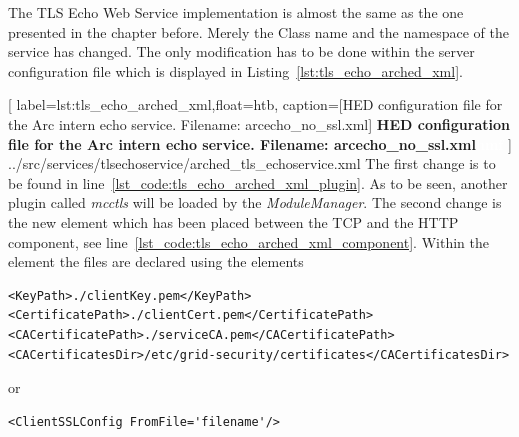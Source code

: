 The TLS Echo Web Service implementation is almost the same as the one presented in the chapter before. Merely the Class name and the namespace of the service has changed. The only modification has to be done within the server configuration file which is displayed in Listing~\ref{lst:tls_echo_arched_xml}.


	[
	label=lst:tls_echo_arched_xml,float=htb,
	caption={[HED configuration file for the Arc intern echo service. Filename: arcecho\_no\_ssl.xml]
	\textbf{HED configuration file for the Arc intern echo service. Filename: arcecho\_no\_ssl.xml\textcolor{white}{hmf}}}
	]
{../src/services/tlsechoservice/arched_tls_echoservice.xml}
The first change is to be found in line~\ref{lst_code:tls_echo_arched_xml_plugin}. As to be seen, another plugin called \textit{mcctls} will be loaded by the \textit{ModuleManager}. The second change is the new element which has been placed between the TCP and the HTTP component, see line~\ref{lst_code:tls_echo_arched_xml_component}. Within the element the files are declared using the elements
\begin{verbatim}
<KeyPath>./clientKey.pem</KeyPath>
<CertificatePath>./clientCert.pem</CertificatePath>
<CACertificatePath>./serviceCA.pem</CACertificatePath>
<CACertificatesDir>/etc/grid-security/certificates</CACertificatesDir>
\end{verbatim}
or
\begin{verbatim}
<ClientSSLConfig FromFile='filename'/>
\end{verbatim}


%
%
%
%
% 


